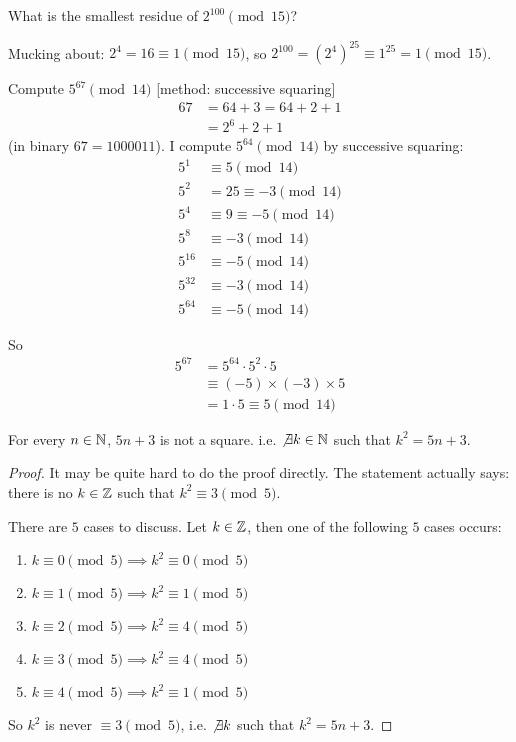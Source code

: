 \documentclass[twoside]{scrartcl}
\begin{document}
\begin{example}
What is the smallest residue of $2^{100} \pmod{15}$? 	

Mucking about: $2^4 = 16 \equiv 1 \pmod{15}$, so $2^{100} = (2^4)^{25} \equiv 1^{25} = 1\pmod{15}$. 
\end{example}\vspace*{5pt}


\begin{example}
Compute $5^{67} \pmod{14}$ [method: successive squaring]
\[
\begin{aligned}
  67 &= 64 + 3 = 64 + 2 + 1 \\
  &= 2^6 + 2 + 1
\end{aligned}
\]
(in binary $67 = 1000011$). I compute $5^{64} \pmod{14}$ by successive squaring: 
\[
\begin{aligned}
  5^1 &\equiv 5 \pmod{14}\\
  5^2 &= 25 \equiv -3 \pmod{14}\\
  5^4 &\equiv 9 \equiv -5 \pmod{14}\\
  5^8 &\equiv -3 \pmod{14}\\
  5^{16} &\equiv -5 \pmod{14}\\
  5^{32} &\equiv -3 \pmod{14}\\
  5^{64} &\equiv -5 \pmod{14} 
\end{aligned}
\]

So
\[
\begin{aligned}
  5^{67} &= 5^{64} \cdot 5^2 \cdot 5\\
  &\equiv (-5) \times (-3) \times 5\\
  &= 1\cdot 5 \equiv 5 \pmod{14}
\end{aligned}
\]
\end{example}\vspace*{5pt}

\begin{example}
For every $n\in\mathbb{N}$, $5n + 3$ is not a square. i.e. $\not\exists k \in\mathbb{N}$ such that $k^2 = 5n + 3$. 

\begin{proof}
It may be quite hard to do the proof directly. The statement actually says: there is no $k \in\mathbb{Z}$ such that $k^2 \equiv 3 \pmod{5}$. 

There are $5$ cases to discuss. Let $k\in\mathbb{Z}$, then one of the following $5$ cases occurs: 
\begin{enumerate}
\item $k \equiv 0\pmod{5} \implies k^2\equiv 0 \pmod{5}$
\item $k \equiv 1\pmod{5} \implies k^2\equiv 1 \pmod{5}$
\item $k \equiv 2\pmod{5} \implies k^2\equiv 4 \pmod{5}$
\item $k \equiv 3\pmod{5} \implies k^2\equiv 4 \pmod{5}$
\item $k \equiv 4\pmod{5} \implies k^2\equiv 1 \pmod{5}$
\end{enumerate}

So $k^2$ is never $\equiv 3 \pmod{5}$, i.e. $\not\exists k$ such that $k^2  = 5n+3$.
\end{proof}
\end{example}\vspace*{5pt}
\end{document}
